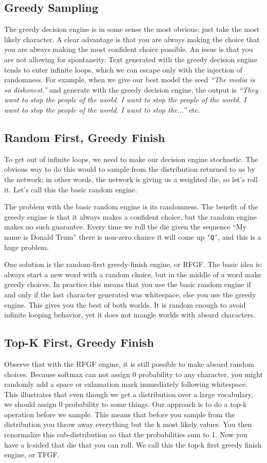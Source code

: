 \documentclass{article}
\begin{document}
\subsection{Greedy Sampling}
The greedy decision engine is in some sense the most obvious: just take the most likely character. A clear advantage is that you are always making the choice that you are always making the most confident choice possible. An issue is that you are not allowing for spontaneity. Text generated with the greedy decision engine tends to enter infinite loops, which we can escape only with the injection of randomness. For example, when we give our best model the seed \textit{``The media is so dishonest.''} and generate with the greedy decision engine, the output is \textit{``They want to stop the people of the world. I want to stop the people of the world. I want to stop the people of the world. I want to stop the...''} etc.

\subsection{Random First, Greedy Finish}
To get out of infinite loops, we need to make our decision engine stochastic. The obvious way to do this would to sample from the distribution returned to us by the network; in other words, the network is giving us a weighted die, so let's roll it. Let's call this the basic random engine.

The problem with the basic random engine is its randomness. The benefit of the greedy engine is that it always makes a confident choice, but the random engine makes no such guarantee. Every time we roll the die given the sequence ``My name is Donald Trum'' there is non-zero chance it will come up \texttt{`Q'}, and this is a huge problem.

One solution is the random-first greedy-finish engine, or RFGF. The basic idea is: always start a new word with a random choice, but in the middle of a word make greedy choices. In practice this means that you use the basic random engine if and only if the last character generated was whitespace, else you use the greedy engine. This gives you the best of both worlds. It is random enough to avoid infinite looping behavior, yet it does not mangle worlds with absurd characters.

\subsection{Top-K First, Greedy Finish}
Observe that with the RFGF engine, it is still possible to make absurd random choices. Because softmax can not assign 0 probability to any character, you might randomly add a space or exlamation mark immediately following whitespace. This illustrates that even though we get a distribution over a large vocabulary, we should assign 0 probability to some things. Our approach is to do a top-k operation before we sample. This means that before you sample from the distribution you throw away everything but the k most likely values. You then renormalize this sub-distribution so that the probabilities sum to 1. Now you have a k-sided that die that you can roll. We call this the top-k first greedy finish engine, or TFGF.
\end{document}
